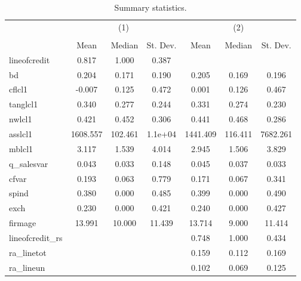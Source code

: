 \begin{table}[htbp]\centering
\def\sym#1{\ifmmode^{#1}\else\(^{#1}\)\fi}
\caption{Summary statistics.}
\begin{tabular}{l*{2}{ccc}}
\hline\hline
            &\multicolumn{3}{c}{(1)}               &\multicolumn{3}{c}{(2)}               \\
            &\multicolumn{3}{c}{}                  &\multicolumn{3}{c}{}                  \\
            &        Mean&      Median&    St. Dev.&        Mean&      Median&    St. Dev.\\
\hline
lineofcredit&       0.817&       1.000&       0.387&            &            &            \\
bd          &       0.204&       0.171&       0.190&       0.205&       0.169&       0.196\\
cflcl1      &      -0.007&       0.125&       0.472&       0.001&       0.126&       0.467\\
tanglcl1    &       0.340&       0.277&       0.244&       0.331&       0.274&       0.230\\
nwlcl1      &       0.421&       0.452&       0.306&       0.441&       0.468&       0.286\\
asslcl1     &    1608.557&     102.461&     1.1e+04&    1441.409&     116.411&    7682.261\\
mblcl1      &       3.117&       1.539&       4.014&       2.945&       1.506&       3.829\\
q\_salesvar  &       0.043&       0.033&       0.148&       0.045&       0.037&       0.033\\
cfvar       &       0.193&       0.063&       0.779&       0.171&       0.067&       0.341\\
spind       &       0.380&       0.000&       0.485&       0.399&       0.000&       0.490\\
exch        &       0.230&       0.000&       0.421&       0.240&       0.000&       0.427\\
firmage     &      13.991&      10.000&      11.439&      13.714&       9.000&      11.414\\
lineofcredit\_rs&            &            &            &       0.748&       1.000&       0.434\\
ra\_linetot  &            &            &            &       0.159&       0.112&       0.169\\
ra\_lineun   &            &            &            &       0.102&       0.069&       0.125\\

\end{tabular}
\end{table}
